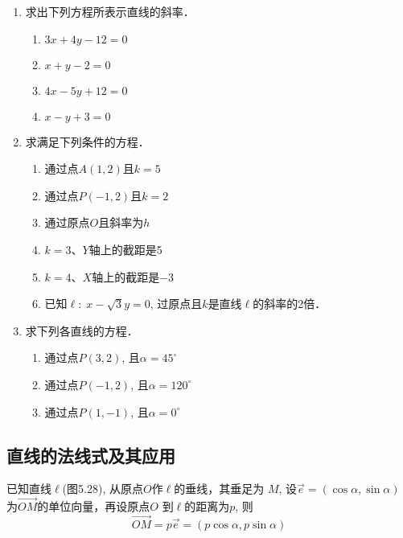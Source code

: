 \begin{ex}
\begin{enumerate}
    \item 求出下列方程所表示直线的斜率．
\begin{multicols}{2}
\begin{enumerate}
    \item $3x+4y-12=0$
    \item $x+y-2=0$
    \item $4x-5y+12=0$
    \item $x-y+3=0$
\end{enumerate}
\end{multicols}

\item 求满足下列条件的方程．
\begin{enumerate}
    \item 通过点$A(1,2)$且$k=5$
    \item 通过点$P(-1,2)$且$k=2$
    \item 通过原点$O$且斜率为$h$
    \item $k=3$、$Y$轴上的截距是5
    \item $k=4$、$X$轴上的截距是$-3$
    \item 已知$\ell:\; x-\sqrt{3}y=0$, 过原点且$k$是直线$\ell$的斜率的2倍．
\end{enumerate}

\item 求下列各直线的方程．
\begin{enumerate}
    \item 通过点$P(3,2)$, 且$\alpha=45^{\circ}$
    \item 通过点$P(-1,2)$, 且$\alpha=120^{\circ}$
    \item 通过点$P(1,-1)$, 且$\alpha=0^{\circ}$
\end{enumerate}
\end{enumerate}
\end{ex}

\subsection{直线的法线式及其应用}
已知直线$\ell$(图5.28), 
从原点$O$作$\ell$的垂线，其垂足为
$M$, 设$\vec{e}=(\cos\alpha,\sin\alpha)$
为$\Vec{OM}$的单位向量，再设原点$O$
到$\ell$的距离为$p$, 则
\[\Vec{OM}=p\vec{e}=(p\cos\alpha, p\sin\alpha)\]

\begin{figure}[htp]
    \centering
    \caption{}
\end{figure}


